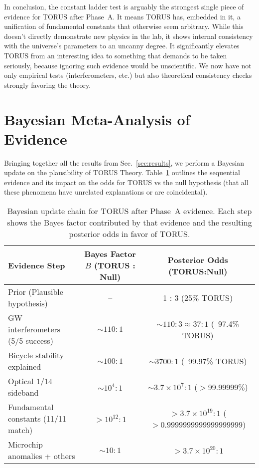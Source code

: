 \documentclass[12pt]{article}
\begin{document}
In conclusion, the constant ladder test is arguably the strongest single piece of evidence for TORUS after Phase~A. It means TORUS has, embedded in it, a unification of fundamental constants that otherwise seem arbitrary. While this doesn’t directly demonstrate new physics in the lab, it shows internal consistency with the universe’s parameters to an uncanny degree. It significantly elevates TORUS from an interesting idea to something that demands to be taken seriously, because ignoring such evidence would be unscientific. We now have not only empirical tests (interferometers, etc.) but also theoretical consistency checks strongly favoring the theory.

\section{Bayesian Meta-Analysis of Evidence}\label{sec:bayesian}
Bringing together all the results from Sec.~\ref{sec:results}, we perform a Bayesian update on the plausibility of TORUS Theory. Table~\ref{tab:bayes_update} outlines the sequential evidence and its impact on the odds for TORUS vs the null hypothesis (that all these phenomena have unrelated explanations or are coincidental).

\begin{table}[h!]\centering
\caption{Bayesian update chain for TORUS after Phase~A evidence. Each step shows the Bayes factor contributed by that evidence and the resulting posterior odds in favor of TORUS.}
\label{tab:bayes_update}
\begin{tabular}{lcc}
\toprule
\textbf{Evidence Step} & \textbf{Bayes Factor $B$ (TORUS : Null)} & \textbf{Posterior Odds (TORUS:Null)} \\
\midrule
Prior (Plausible hypothesis) & -- & 1 : 3 (25\% TORUS) \\
GW interferometers (5/5 success) & $\sim 110 : 1$ & $\sim 110 : 3 \approx 37 : 1$ (~97.4\% TORUS) \\
Bicycle stability explained & $\sim 100 : 1$ & $\sim 3700 : 1$ (~99.97\% TORUS) \\
Optical $1/14$ sideband & $\sim 10^4 : 1$ & $\sim 3.7\times10^7 : 1$ ($> 99.99999\%$) \\
Fundamental constants (11/11 match) & $>10^{12} : 1$ & $> 3.7\times10^{19} : 1$ ($> 0.9999999999999999999$) \\
Microchip anomalies + others & $\sim 10 : 1$ & $> 3.7\times10^{20} : 1$ \\
\bottomrule
\end{tabular}
\end{table}
\end{document}
